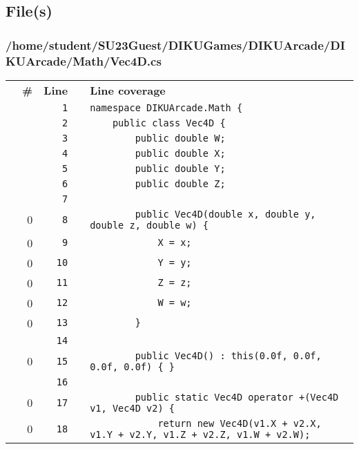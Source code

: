 \documentclass[a4paper,landscape,10pt]{article}
\begin{document}
\subsection{File(s)}
\subsubsection{/home/student/SU23Guest/DIKUGames/DIKUArcade/DIKUArcade/Math/Vec4D.cs}
\begin{longtable}[l]{lrrll}
\textbf{} & \textbf{\#} & \textbf{Line} & \textbf{} & \textbf{Line coverage}\\
\cellcolor{gray} &  & \verb~1~ & & \verb~namespace DIKUArcade.Math {~\\
\cellcolor{gray} &  & \verb~2~ & & \verb~    public class Vec4D {~\\
\cellcolor{gray} &  & \verb~3~ & & \verb~        public double W;~\\
\cellcolor{gray} &  & \verb~4~ & & \verb~        public double X;~\\
\cellcolor{gray} &  & \verb~5~ & & \verb~        public double Y;~\\
\cellcolor{gray} &  & \verb~6~ & & \verb~        public double Z;~\\
\cellcolor{gray} &  & \verb~7~ & & \verb~~\\
\cellcolor{red} & 0 & \verb~8~ & & \verb~        public Vec4D(double x, double y, double z, double w) {~\\
\cellcolor{red} & 0 & \verb~9~ & & \verb~            X = x;~\\
\cellcolor{red} & 0 & \verb~10~ & & \verb~            Y = y;~\\
\cellcolor{red} & 0 & \verb~11~ & & \verb~            Z = z;~\\
\cellcolor{red} & 0 & \verb~12~ & & \verb~            W = w;~\\
\cellcolor{red} & 0 & \verb~13~ & & \verb~        }~\\
\cellcolor{gray} &  & \verb~14~ & & \verb~~\\
\cellcolor{red} & 0 & \verb~15~ & & \verb~        public Vec4D() : this(0.0f, 0.0f, 0.0f, 0.0f) { }~\\
\cellcolor{gray} &  & \verb~16~ & & \verb~~\\
\cellcolor{red} & 0 & \verb~17~ & & \verb~        public static Vec4D operator +(Vec4D v1, Vec4D v2) {~\\
\cellcolor{red} & 0 & \verb~18~ & & \verb~            return new Vec4D(v1.X + v2.X, v1.Y + v2.Y, v1.Z + v2.Z, v1.W + v2.W);~\\

\end{longtable}
\end{document}
